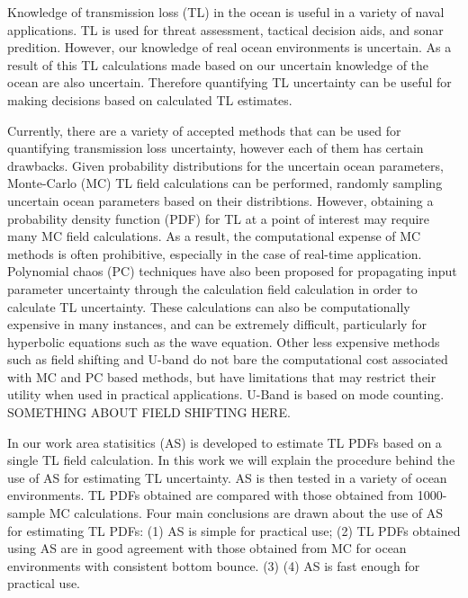 Knowledge of transmission loss (TL) in the ocean is useful in a variety of naval applications.  TL is used for threat assessment, tactical decision aids, and sonar predition.  However, our knowledge of real ocean environments is uncertain.  As a result of this TL calculations made based on our uncertain knowledge of the ocean are also uncertain.  Therefore quantifying TL uncertainty can be useful for making decisions based on calculated TL estimates.

Currently, there are a variety of accepted methods that can be used for quantifying transmission loss uncertainty, however each of them has certain drawbacks.  Given probability distributions for the uncertain ocean parameters, Monte-Carlo (MC) TL field calculations can be performed, randomly sampling uncertain ocean parameters based on their distribtions.  However, obtaining a probability density function (PDF) for TL at a point of interest may require many MC field calculations.  As a result, the computational expense of MC methods is often prohibitive, especially in the case of real-time application.  Polynomial chaos (PC) techniques have also been proposed for propagating input parameter uncertainty through the calculation field calculation in order to calculate TL uncertainty.  These calculations can also be computationally expensive in many instances, and can be extremely difficult, particularly for hyperbolic equations such as the wave equation.  Other less expensive methods such as field shifting and U-band do not bare the computational cost associated with MC and PC based methods, but have limitations that may restrict their utility when used in practical applications.  U-Band is based on mode counting.  SOMETHING ABOUT FIELD SHIFTING HERE.

In our work area statisitics (AS) is developed to estimate TL PDFs based on a single TL field calculation.  In this work we will explain the procedure behind the use of AS for estimating TL uncertainty.  AS is then tested in a variety of ocean environments.  TL PDFs obtained are compared with those obtained from 1000-sample MC calculations.  Four main conclusions are drawn about the use of AS for estimating TL PDFs: (1)  AS is simple for practical use; (2) TL PDFs obtained using AS are in good agreement with those obtained from MC for ocean environments with consistent bottom bounce. (3) (4) AS is fast enough for practical use.  
